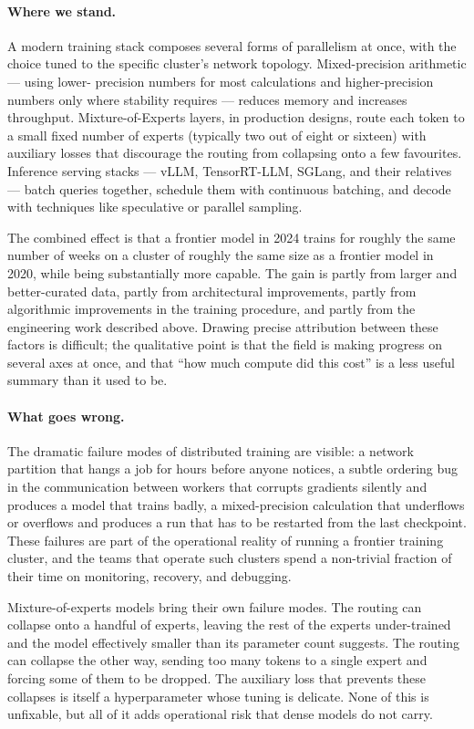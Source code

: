 \paragraph{Where we stand.} A modern training stack composes several forms of parallelism
at once, with the choice tuned to the specific cluster's
network topology. Mixed-precision arithmetic --- using lower-
precision numbers for most calculations and higher-precision
numbers only where stability requires --- reduces memory and
increases throughput. Mixture-of-Experts layers, in production
designs, route each token to a small fixed number of experts
(typically two out of eight or sixteen) with auxiliary losses
that discourage the routing from collapsing onto a few
favourites. Inference serving stacks --- vLLM, TensorRT-LLM,
SGLang, and their relatives --- batch queries together,
schedule them with continuous batching, and decode with
techniques like speculative or parallel sampling.

The combined effect is that a frontier model in 2024 trains for
roughly the same number of weeks on a cluster of roughly the
same size as a frontier model in 2020, while being substantially
more capable. The gain is partly from larger and better-curated
data, partly from architectural improvements, partly from
algorithmic improvements in the training procedure, and partly
from the engineering work described above. Drawing precise
attribution between these factors is difficult; the qualitative
point is that the field is making progress on several axes at
once, and that ``how much compute did this cost'' is a less
useful summary than it used to be.

\paragraph{What goes wrong.} The dramatic failure modes of distributed training are visible:
a network partition that hangs a job for hours before anyone
notices, a subtle ordering bug in the communication between
workers that corrupts gradients silently and produces a model
that trains badly, a mixed-precision calculation that underflows
or overflows and produces a run that has to be restarted from
the last checkpoint. These failures are part of the operational
reality of running a frontier training cluster, and the teams
that operate such clusters spend a non-trivial fraction of
their time on monitoring, recovery, and debugging.

Mixture-of-experts models bring their own failure modes. The
routing can collapse onto a handful of experts, leaving the
rest of the experts under-trained and the model effectively
smaller than its parameter count suggests. The routing can
collapse the other way, sending too many tokens to a single
expert and forcing some of them to be dropped. The auxiliary
loss that prevents these collapses is itself a hyperparameter
whose tuning is delicate. None of this is unfixable, but all of
it adds operational risk that dense models do not carry.

